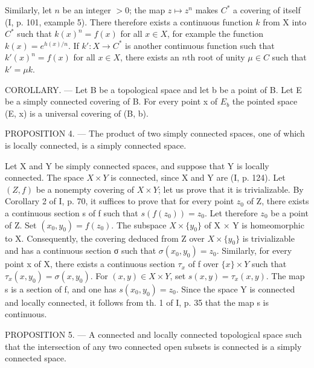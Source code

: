 Similarly, let \(n\) be an integer \(>0\); the map \(z \mapsto z^{n}\) makes \(C^{*}\) a covering of itself (I, p. 101, example 5). There therefore exists a continuous function \(k\) from X into \(C^{*}\) such that \(k(x)^{n} = f(x)\) for all \(x \in X\), for example the function \(k(x) = e^{h(x)/n}\). If \(k' : X \to C^{*}\) is another continuous function such that \(k'(x)^{n} = f(x)\) for all \(x \in X\), there exists an \(n\)th root of unity \(\mu \in C\) such that \(k' = \mu k\).

COROLLARY. — Let B be a topological space and let b be a point of B. Let E be a simply connected covering of B. For every point x of \(E_{b}\) the pointed space (E, x) is a universal covering of (B, b).

PROPOSITION 4. --- The product of two simply connected spaces, one of which is locally connected, is a simply connected space.

Let X and Y be simply connected spaces, and suppose that Y is locally connected. The space \(X \times Y\) is connected, since X and Y are (I, p. 124). Let \((Z, f)\) be a nonempty covering of \(X \times Y\); let us prove that it is trivializable. By Corollary 2 of I, p. 70, it suffices to prove that for every point \(z_{0}\) of Z, there exists a continuous section s of f such that \(s(f(z_{0})) = z_{0}\). Let therefore \(z_{0}\) be a point of Z. Set \((x_{0}, y_{0}) = f(z_{0})\). The subspace \(X \times \{y_{0}\}\) of X × Y is homeomorphic to X. Consequently, the covering deduced from Z over \(X \times \{y_{0}\}\) is trivializable and has a continuous section σ such that \(\sigma(x_{0}, y_{0}) = z_{0}\). Similarly, for every point x of X, there exists a continuous section \(\tau_{x}\) of f over \(\{x\} \times Y\) such that \(\tau_{x}(x, y_{0}) = \sigma(x, y_{0})\). For \((x, y) \in X \times Y\), set \(s(x, y) = \tau_{x}(x, y)\). The map s is a section of f, and one has \(s(x_{0}, y_{0}) = z_{0}\). Since the space Y is connected and locally connected, it follows from th. 1 of I, p. 35 that the map s is continuous.

PROPOSITION 5. --- A connected and locally connected topological space such that the intersection of any two connected open subsets is connected is a simply connected space.

